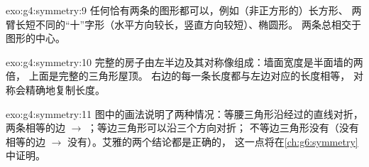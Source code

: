 \begin{solution}{exo:g4:symmetry:9}
任何恰有两条的图形都可以，例如（非正方形的）长方形、
两臂长短不同的“十”字形（水平方向较长，竖直方向较短）、椭圆形。
两条总相交于
图形的中心。
\end{solution}

\begin{solution}{exo:g4:symmetry:10}
完整的房子由左半边及其对称像组成：墙面宽度是半面墙的两倍，
上面是完整的三角形屋顶。
右边的每一条长度都与左边对应的长度相等，
对称会精确地复制长度。
\end{solution}

\begin{solution}{exo:g4:symmetry:11}
图中的画法说明了两种情况：等腰三角形沿经过的直线对折，
两条相等的边 $\to$ ；等边三角形可以沿三个方向对折；
不等边三角形没有（没有相等的边
$\to$ 没有）。艾雅的两个结论都是正确的，
这一点将在\cref{ch:g6:symmetry}中证明。
\end{solution}
